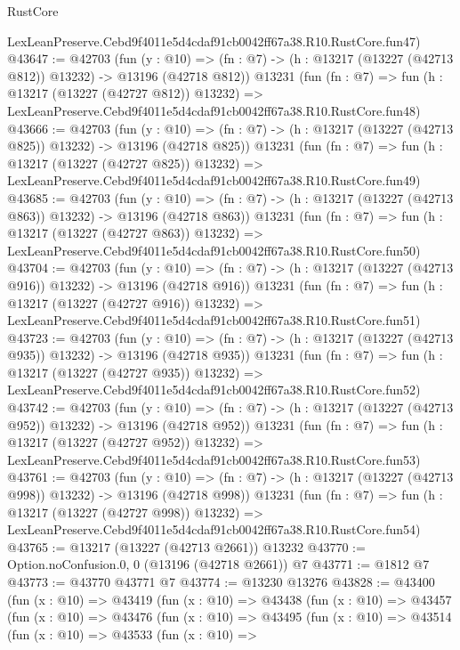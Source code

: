 \begin{lexlean}{RustCore}
\begin{coremodule}
    LexLeanPreserve.Cebd9f4011e5d4cdaf91cb0042ff67a38.R10.RustCore.fun47)
@43647 := @42703
    (fun (y : @10) =>
    (fn : @7) -> (h : @13217 (@13227 (@42713 @812)) @13232) -> @13196 (@42718 @812))
    @13231
    (fun (fn : @7) =>
    fun (h : @13217 (@13227 (@42727 @812)) @13232) =>
    LexLeanPreserve.Cebd9f4011e5d4cdaf91cb0042ff67a38.R10.RustCore.fun48)
@43666 := @42703
    (fun (y : @10) =>
    (fn : @7) -> (h : @13217 (@13227 (@42713 @825)) @13232) -> @13196 (@42718 @825))
    @13231
    (fun (fn : @7) =>
    fun (h : @13217 (@13227 (@42727 @825)) @13232) =>
    LexLeanPreserve.Cebd9f4011e5d4cdaf91cb0042ff67a38.R10.RustCore.fun49)
@43685 := @42703
    (fun (y : @10) =>
    (fn : @7) -> (h : @13217 (@13227 (@42713 @863)) @13232) -> @13196 (@42718 @863))
    @13231
    (fun (fn : @7) =>
    fun (h : @13217 (@13227 (@42727 @863)) @13232) =>
    LexLeanPreserve.Cebd9f4011e5d4cdaf91cb0042ff67a38.R10.RustCore.fun50)
@43704 := @42703
    (fun (y : @10) =>
    (fn : @7) -> (h : @13217 (@13227 (@42713 @916)) @13232) -> @13196 (@42718 @916))
    @13231
    (fun (fn : @7) =>
    fun (h : @13217 (@13227 (@42727 @916)) @13232) =>
    LexLeanPreserve.Cebd9f4011e5d4cdaf91cb0042ff67a38.R10.RustCore.fun51)
@43723 := @42703
    (fun (y : @10) =>
    (fn : @7) -> (h : @13217 (@13227 (@42713 @935)) @13232) -> @13196 (@42718 @935))
    @13231
    (fun (fn : @7) =>
    fun (h : @13217 (@13227 (@42727 @935)) @13232) =>
    LexLeanPreserve.Cebd9f4011e5d4cdaf91cb0042ff67a38.R10.RustCore.fun52)
@43742 := @42703
    (fun (y : @10) =>
    (fn : @7) -> (h : @13217 (@13227 (@42713 @952)) @13232) -> @13196 (@42718 @952))
    @13231
    (fun (fn : @7) =>
    fun (h : @13217 (@13227 (@42727 @952)) @13232) =>
    LexLeanPreserve.Cebd9f4011e5d4cdaf91cb0042ff67a38.R10.RustCore.fun53)
@43761 := @42703
    (fun (y : @10) =>
    (fn : @7) -> (h : @13217 (@13227 (@42713 @998)) @13232) -> @13196 (@42718 @998))
    @13231
    (fun (fn : @7) =>
    fun (h : @13217 (@13227 (@42727 @998)) @13232) =>
    LexLeanPreserve.Cebd9f4011e5d4cdaf91cb0042ff67a38.R10.RustCore.fun54)
@43765 := @13217 (@13227 (@42713 @2661)) @13232
@43770 := Option.noConfusion.{0, 0} (@13196 (@42718 @2661)) @7
@43771 := @1812 @7
@43773 := @43770 @43771 @7
@43774 := @13230 @13276
@43828 := @43400
    (fun (x : @10) =>
    @43419
      (fun (x : @10) =>
      @43438
        (fun (x : @10) =>
        @43457
          (fun (x : @10) =>
          @43476
            (fun (x : @10) =>
            @43495
              (fun (x : @10) =>
              @43514
                (fun (x : @10) =>
                @43533
                  (fun (x : @10) =>

\end{coremodule}
\end{lexlean}
